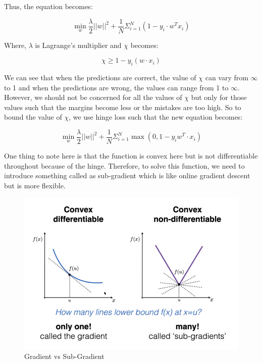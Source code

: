 \documentclass[11pt]{article}
\begin{document}
Thus, the equation becomes:

\begin{equation}
\min_{w}\dfrac{\lambda}{2}||w||^2+\dfrac{1}{N}\Sigma^N_{i=1}(1-y_i \cdot w^T x_i)
\end{equation}


Where, $\lambda$ is Lagrange's multiplier and $\chi$ becomes:

\begin{equation}
    \chi \geq 1-y_i(w \cdot x_i)
\end{equation}

We can see that when the predictions are correct, the value of $\chi$ can vary from $\infty$ to 1 and when the predictions are wrong, the values can range from 1 to $\infty$. However, we should not be concerned for all the values of $\chi$ but only for those values such that the margins become less or the mistakes are too high. So to bound the value of $\chi$, we use hinge loss such that the new equation becomes:

\begin{equation}
\min_{w}\dfrac{\lambda}{2}||w||^2+\dfrac{1}{N}\Sigma^N_{i=1}\max{(0, 1-y_i w^T \cdot x_i)}
\end{equation}

One thing to note here is that the function is convex here but is not differentiable throughout because of the hinge. Therefore, to solve this function, we need to introduce something called as sub-gradient which is like online gradient descent but is more flexible.

\begin{figure}[H]
\begin{center}
\includegraphics[scale=0.35]{figures/GradientvsSubgradient.png}
\end{center}
\caption{Gradient vs Sub-Gradient}
\label{fig:GradientVsSubGradient}
\end{figure}
\end{document}

